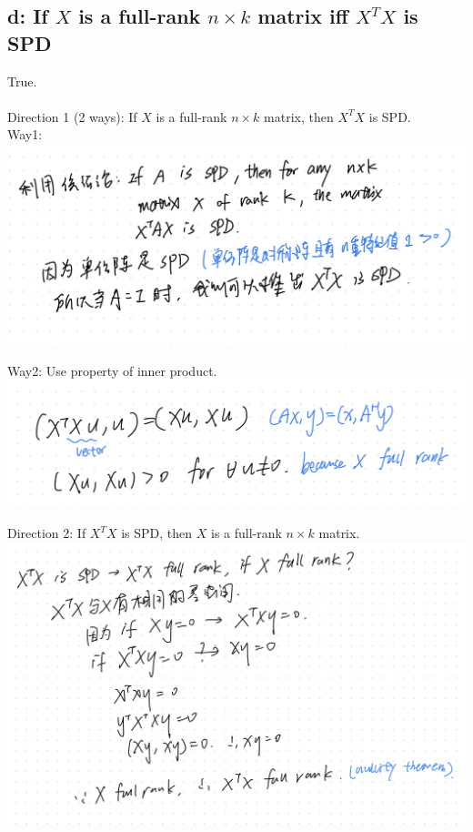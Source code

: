 \documentclass{article}
\begin{document}
\subsection{d: If $X$ is a full-rank $n \times k$ matrix iff $X^TX$ is SPD}
True.\\
\\
Direction 1 (2 ways): If $X$ is a full-rank $n \times k$ matrix, then $X^TX$ is SPD.\\
Way1:\\
\includegraphics[width=1\linewidth]{pr4-2}

\noindent
Way2: Use property of inner product.\\
\includegraphics[width=1\linewidth]{pr4-3}

\medskip
\noindent
Direction 2: If $X^TX$ is SPD, then $X$ is a full-rank $n \times k$ matrix.\\
\includegraphics[width=1\linewidth]{pr4-4}
\end{document}

